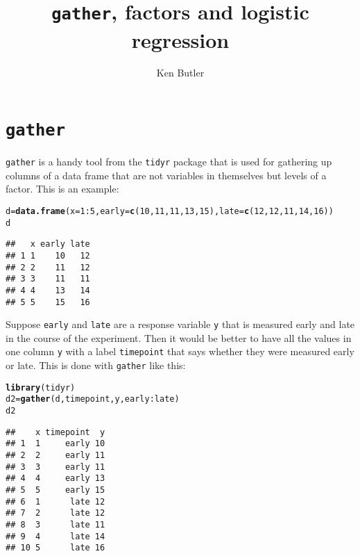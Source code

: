 \documentclass{article}\usepackage[]{graphicx}\usepackage[]{color}
\title{\texttt{gather}, factors and logistic regression}
\author{Ken Butler}
\makeatletter
\newcommand{\hlnum}[1]{\textcolor[rgb]{0.686,0.059,0.569}{#1}}%
\newcommand{\hlopt}[1]{\textcolor[rgb]{0,0,0}{#1}}%
\newcommand{\hlstd}[1]{\textcolor[rgb]{0.345,0.345,0.345}{#1}}%
\newcommand{\hlkwb}[1]{\textcolor[rgb]{0.69,0.353,0.396}{#1}}%
\newcommand{\hlkwc}[1]{\textcolor[rgb]{0.333,0.667,0.333}{#1}}%
\newcommand{\hlkwd}[1]{\textcolor[rgb]{0.737,0.353,0.396}{\textbf{#1}}}%
\newenvironment{kframe}{%
 \def\at@end@of@kframe{}%
 \ifinner\ifhmode%
  \def\at@end@of@kframe{\end{minipage}}%
  \begin{minipage}{\columnwidth}%
 \fi\fi%
 \def\FrameCommand##1{\hskip\@totalleftmargin \hskip-\fboxsep
 \colorbox{shadecolor}{##1}\hskip-\fboxsep
     \hskip-\linewidth \hskip-\@totalleftmargin \hskip\columnwidth}%
 \MakeFramed {\advance\hsize-\width
   \@totalleftmargin\z@ \linewidth\hsize
   \@setminipage}}%
 {\par\unskip\endMakeFramed%
 \at@end@of@kframe}
\newenvironment{knitrout}{}{} %
\makeatother
\begin{document}
\maketitle

\section{\texttt{gather}}

\texttt{gather} is a handy tool from the \texttt{tidyr} package that
is used for gathering up columns of a data frame that are not
variables in themselves but levels of a factor. This is an example:

\begin{knitrout}
\color{fgcolor}\begin{kframe}
\begin{alltt}
\hlstd{d}\hlkwb{=}\hlkwd{data.frame}\hlstd{(}\hlkwc{x}\hlstd{=}\hlnum{1}\hlopt{:}\hlnum{5}\hlstd{,}\hlkwc{early}\hlstd{=}\hlkwd{c}\hlstd{(}\hlnum{10}\hlstd{,}\hlnum{11}\hlstd{,}\hlnum{11}\hlstd{,}\hlnum{13}\hlstd{,}\hlnum{15}\hlstd{),}\hlkwc{late}\hlstd{=}\hlkwd{c}\hlstd{(}\hlnum{12}\hlstd{,}\hlnum{12}\hlstd{,}\hlnum{11}\hlstd{,}\hlnum{14}\hlstd{,}\hlnum{16}\hlstd{))}
\hlstd{d}
\end{alltt}
\begin{verbatim}
##   x early late
## 1 1    10   12
## 2 2    11   12
## 3 3    11   11
## 4 4    13   14
## 5 5    15   16
\end{verbatim}
\end{kframe}
\end{knitrout}

Suppose \texttt{early} and \texttt{late} are a response
variable \texttt{y} that is measured early and late in the course of
the experiment. Then it would be better to have all the values in one
column \texttt{y} with a label \texttt{timepoint} that says whether
they were measured early or late. This is done with \texttt{gather}
like this:

\begin{knitrout}
\color{fgcolor}\begin{kframe}
\begin{alltt}
\hlkwd{library}\hlstd{(tidyr)}
\hlstd{d2}\hlkwb{=}\hlkwd{gather}\hlstd{(d,timepoint,y,early}\hlopt{:}\hlstd{late)}
\hlstd{d2}
\end{alltt}
\begin{verbatim}
##    x timepoint  y
## 1  1     early 10
## 2  2     early 11
## 3  3     early 11
## 4  4     early 13
## 5  5     early 15
## 6  1      late 12
## 7  2      late 12
## 8  3      late 11
## 9  4      late 14
## 10 5      late 16
\end{verbatim}
\end{kframe}
\end{knitrout}
\end{document}
